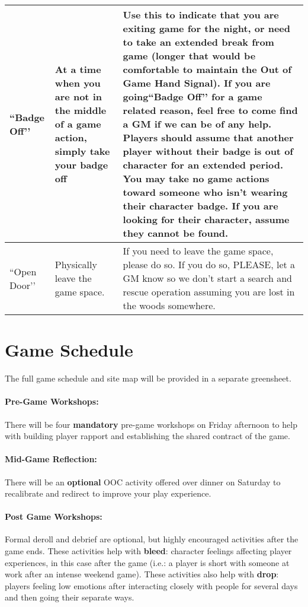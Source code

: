 \documentclass[sheet]{GL2020}
\begin{document}
\begin{tabularx}{\textwidth}{|>{\centering\arraybackslash} m{1.5cm} | >{\centering\arraybackslash} m{2.5cm} | >{\centering\arraybackslash}X |}
    \hline
``Badge Off'’ & At a time when you are not in the middle of a game action, simply take your badge off & Use this to indicate that you are exiting game for the night, or need to take an extended break from game (longer that would be comfortable to maintain the Out of Game Hand Signal). If you are going``Badge Off'’ for a game related reason, feel free to come find a GM if we can be of any help. Players should assume that another player without their badge is out of character for an extended period. You may take no game actions toward someone who isn't wearing their character badge. If you are looking for their character, assume they cannot be found. \\
    \hline
``Open Door'’ & Physically leave the game space. & If you need to leave the game space, please do so. If you do so, PLEASE, let a GM know so we don't start a search and rescue operation assuming you are lost in the woods somewhere. \\
    \hline
\end{tabularx}

\section{Game Schedule}
The full game schedule and site map will be provided in a separate greensheet. 

\paragraph{Pre-Game Workshops:} There will be four \textbf{mandatory} pre-game workshops on Friday afternoon to help with building player rapport and establishing the shared contract of the game.

\paragraph{Mid-Game Reflection:} There will be an \textbf{optional} OOC activity offered over dinner on  Saturday to recalibrate and redirect to improve your play experience.

\paragraph{Post Game Workshops:} Formal deroll and debrief are optional, but highly encouraged activities after the game ends. These activities help with \textbf{bleed}: character feelings affecting player experiences, in this case after the game (i.e.: a player is short with someone at work after an intense weekend game). These activities also help with \textbf{drop}: players feeling low emotions after interacting closely with people for several days and then going their separate ways.
\end{document}
